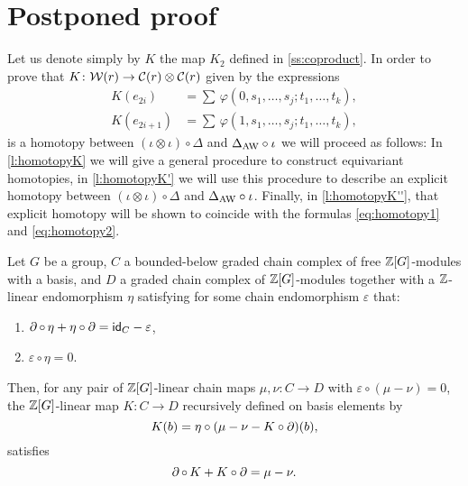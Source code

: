 
\section{Postponed proof}\label{s:postponed}

Let us denote simply by $K$ the map $K_2$ defined in \cref{ss:coproduct}.
In order to prove that $K \colon \mathcal{W}(r) \to \mathcal{C}(r) \otimes \mathcal{C}(r)$ given by the expressions
\begin{align}
	\label{eq:homotopy1}
	K(e_{2i})   &= \sum \, \varphi(0,s_1,\dots,s_j;t_1,\dots,t_k), \\
	\label{eq:homotopy2}
	K(e_{2i+1}) &= \sum \, \varphi(1,s_1,\dots,s_j;t_1,\dots,t_k),
\end{align}
is a homotopy between $(\iota\otimes \iota)\circ \Delta$ and $\Delta_{\operatorname{AW}}\circ \iota$ we will proceed as follows: In \cref{l:homotopyK} we will give a general procedure to construct equivariant homotopies, in \cref{l:homotopyK'} we will use this procedure to describe an explicit homotopy between $(\iota\otimes \iota)\circ \Delta$ and $\Delta_{\operatorname{AW}}\circ \iota$.
Finally, in \cref{l:homotopyK''}, that explicit homotopy will be shown to coincide with the formulas \eqref{eq:homotopy1} and \eqref{eq:homotopy2}.

\begin{lemma}\label{l:homotopyK}
	Let $G$ be a group, $C$ a bounded-below graded chain complex of free $\mathbb{Z}[G]$-modules with a basis, and $D$ a graded chain complex of $\mathbb{Z}[G]$-modules together with a $\mathbb{Z}$-linear endomorphism $\eta$ satisfying for some chain endomorphism $\varepsilon$ that:
	\begin{enumerate}
		\item $\operatorname{\partial} \circ \, \eta + \eta \circ \operatorname{\partial} = \mathsf{id}_C - \varepsilon$,
		\item $\varepsilon\circ \eta = 0$.
	\end{enumerate}
	Then, for any pair of $\mathbb{Z}[G]$-linear chain maps $\mu,\nu \colon C \to D$ with $\varepsilon \circ (\mu-\nu) = 0$, the $\mathbb{Z}[G]$-linear map $K \colon C \to D$ recursively defined on basis elements by
	\[
	K(b) = \eta \circ (\mu - \nu - K \circ \operatorname{\partial})(b),
	\]
	satisfies
	\[
	\operatorname{\partial} \circ \, K + K \circ \operatorname{\partial} = \mu - \nu.
	\]
\end{lemma}

